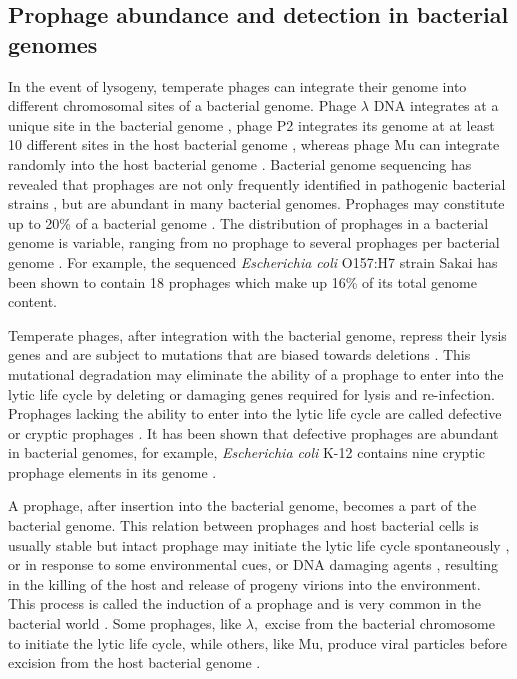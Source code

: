   \subsection{Prophage abundance and detection in bacterial genomes}
In the event of lysogeny, temperate phages can integrate their genome into different chromosomal sites of a bacterial genome. Phage $\lambda$ DNA integrates at a unique site in the bacterial genome \cite{tal_location_2014}, phage P2 integrates its genome at at least 10 different sites in the host bacterial genome \cite{barreiro_attachment_1992}, whereas phage Mu can integrate randomly into the host bacterial genome \cite{bukhari_random_1972}. Bacterial genome sequencing has revealed that prophages are not only frequently identified in pathogenic bacterial strains \citep{canchaya_impact_2004}, but are abundant in many bacterial genomes. Prophages may constitute up to 20\% of a bacterial genome \citep{casjens_prophages_2003}. The distribution of prophages in a bacterial genome is variable, ranging from no prophage to several prophages per bacterial genome  \citep{touchon_genetic_2016}. For example, the sequenced \textit{Escherichia coli} O157:H7 strain Sakai has been shown to contain 18 prophages which make up 16\% of its total genome content. 

Temperate phages, after integration with the bacterial genome, repress their lysis genes \citep{lawrence_where_2001} and are subject to mutations that are biased towards deletions \citep{casjens_prophages_2003}.  This mutational degradation may eliminate the ability of a prophage to enter into the lytic life cycle by deleting or damaging genes required for lysis and re-infection.  Prophages lacking the ability to enter into the lytic life cycle are called defective or cryptic prophages \cite{de_bruijn_prophages_1998}. It has been shown that defective prophages are abundant in bacterial genomes, for example, \textit{Escherichia coli} K-12 contains nine cryptic prophage elements in its genome \citep{wang_cryptic_2010}. 

A prophage, after insertion into the bacterial genome, becomes a part of the bacterial genome.  This relation between prophages and host bacterial cells is usually stable but intact prophage may initiate the lytic life cycle spontaneously \cite{ fothergill_effect_2011, james_differential_2012}, or in response to some environmental cues, or DNA damaging agents \cite{ barnhart_prophage_1976, lopez_induction_2014}, resulting in the killing of the host and release of progeny virions into the environment. This process is called the induction of a prophage and is very common in the bacterial world \cite{ alexeeva_spontaneously_2018}.  Some prophages, like $\lambda,$ excise from the bacterial chromosome to initiate the lytic life cycle, while others, like Mu, produce viral particles before excision from the host bacterial genome \citep{shapiro_molecular_1979}.

